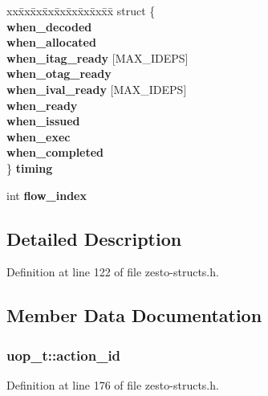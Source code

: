 \begin{CompactItemize}
\begin{tabbing}
\end{tabbing}\item 
\begin{tabbing}
xx\=xx\=xx\=xx\=xx\=xx\=xx\=xx\=xx\=\kill
struct \{\\
 {\bf when\_decoded}\\
 {\bf when\_allocated}\\
 {\bf when\_itag\_ready} [MAX\_IDEPS]\\
 {\bf when\_otag\_ready}\\
 {\bf when\_ival\_ready} [MAX\_IDEPS]\\
 {\bf when\_ready}\\
 {\bf when\_issued}\\
 {\bf when\_exec}\\
 {\bf when\_completed}\\
\} {\bf timing}\\

\end{tabbing}\item 
int {\bf flow\_\-index}
\end{CompactItemize}


\subsection{Detailed Description}


Definition at line 122 of file zesto-structs.h.

\subsection{Member Data Documentation}
\subsubsection[{action\_\-id}]{ {\bf uop\_\-t::action\_\-id}}\label{structuop__t_47dc4af18b603fd6693da3d213ff3298}




Definition at line 176 of file zesto-structs.h.

